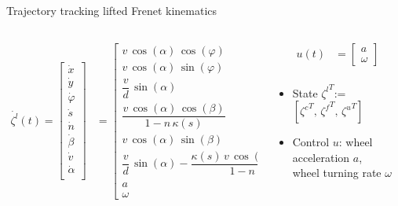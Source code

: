 \documentclass[10pt,aspectratio=1610]{beamer} %
\begin{document}
\begin{frame}{Trajectory tracking lifted Frenet kinematics}
	\begin{columns}[onlytextwidth]

		\begin{column}{0.5\textwidth}
		\begin{align*}
			\dot{\zeta^{l}}(t) = 
			\begin{bmatrix}
				\dot{x}\\
				\dot{y}\\
				\dot{\varphi}\\
				\dot{s}\\
				\dot{n}\\
				\dot{\beta}\\
				\dot{v}\\
				\dot{\alpha}\\
			\end{bmatrix} &= 
			\begin{bmatrix}
				v\, \cos(\alpha)\, \cos(\varphi)\\
				v\, \cos(\alpha)\, \sin(\varphi)\\
				\dfrac{v}{d}\, \sin(\alpha)\\
				\dfrac{v\, \cos(\alpha)\, \cos(\beta)}{1 - n\, \kappa(s)}\\
				v\, \cos(\alpha)\, \sin(\beta)\\
				\dfrac{v}{d}\, \sin(\alpha) - \dfrac{\kappa(s)\, v\, \cos(\alpha)\, \cos(\beta)}{1 - n\, \kappa(s)}\\
				a\\
				\omega
			\end{bmatrix}
		\end{align*}
		\end{column}
		\begin{column}{0.5\textwidth}
		\begin{align*}
			u(t) &= 
			\begin{bmatrix}
				a \\
				\omega
			\end{bmatrix}\\
		\end{align*}
		\begin{itemize}[label=\textbullet]
			\item State ${\zeta^{l}}^T$:= $[{\zeta^{c}}^T,\,{\zeta^{f}}^T,\,{\zeta^{u}}^T]$
			\item Control $u$: wheel acceleration $a$,\\
			\hspace{0.62in} wheel turning rate $\omega$
		\end{itemize}
		\end{column}
	\end{columns}
\end{frame}
\end{document}
